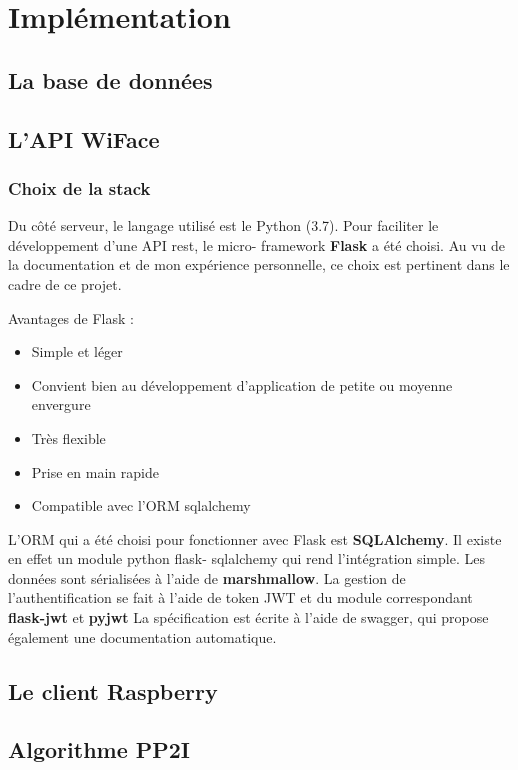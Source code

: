 \chapter{Implémentation}
\label{ch:implémentation}

\section{La base de données}

\section{L'API WiFace}

\subsection{Choix de la stack}

Du côté serveur, le langage utilisé est le Python (3.7). Pour faciliter le développement d’une API rest, le micro-
framework \textbf{Flask} a été choisi. Au vu de la documentation et de mon expérience personnelle, ce choix est pertinent
dans le cadre de ce projet.

Avantages de Flask :
\begin{itemize}
\item Simple et léger
\item Convient bien au développement d’application de petite ou moyenne envergure
\item Très flexible
\item Prise en main rapide
\item Compatible avec l’ORM sqlalchemy
\end{itemize}

L’ORM qui a été choisi pour fonctionner avec Flask est \textbf{SQLAlchemy}. Il existe en effet un module python flask-
sqlalchemy qui rend l’intégration simple.
Les données sont sérialisées à l’aide de \textbf{marshmallow}.
La gestion de l’authentification se fait à l’aide de token JWT et du module correspondant \textbf{flask-jwt} et \textbf{pyjwt}
La spécification est écrite à l’aide de swagger, qui propose également une documentation automatique.

\section{Le client Raspberry}

\section{Algorithme PP2I}